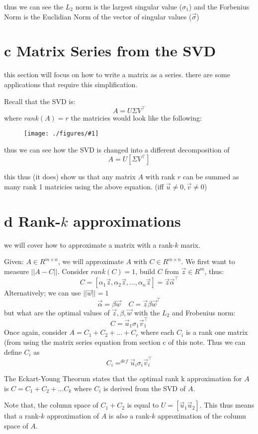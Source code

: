 \documentclass[12pt]{book}
\newcommand{\incimg}[2]{%
       \begin{figure}[h]
               \centering
               \texttt{[image: ./figures/\#1]}
       \end{figure}
}
\begin{document}
thus we can see the $L_2$ norm is the largest singular value ($\sigma_1$) and the Forbenius Norm
is the Euclidian Norm of the vector of singular values ($\vec\sigma$)

\section*{c Matrix Series from the SVD}
this section will focus on how to write a matrix as a series.
there are some applications that require this simplification.

Recall that the SVD is:
\[A = U\Sigma V^\top\]
where $rank(A) = r$
the matricies would look like the following:
\incimg{Explaination}{0.7}

thus we can see how the SVD is changed into a different decomposition of 
\[A = U[\Sigma V^\top]\]

this thus (it does) show us that any matrix $A$ with rank $r$ can be summed as many rank 1
matricies using the above equation. (iff $\vec u \neq 0, \vec v \neq 0$)

\section*{d Rank-$k$ approximations}
we will cover how to approximate a matrix with a rank-$k$ marix.

Given: $A\in R^{m\times n}$, we will approximate $A$ with $C\in R^{m\times n}$.
We first want to measure $||A-C||$.
Consider $rank(C) = 1$, build $C$ from $\vec z \in R^m$, thus:
\[C = [\alpha_1\vec z, \alpha_2\vec z, ..., \alpha_n \vec z] = \vec z \vec \alpha^\top\]
Alternatively; we can use $||\vec w|| = 1$
\[\vec \alpha = \beta\vec w\;\;\;\; C = \vec z\beta\vec w^\top\]
but what are the optimal values of $\vec z, \beta, \vec w$ with the $L_2$ and Frobenius norm:
\[C = \vec u_1 \sigma_1 \vec v_1^\top\]
Once again, consider $A = C_1 + C_2 + ... + C_r$ where each $C_i$ is a rank one matrix (from
using the matrix series equation from section c of this note. Thus we can define $C_i$ as
\[C_i =^{def} \vec u_i \sigma_i \vec v^\top_i\]

The Eckart-Young Theorum states that the optimal rank k approximation for $A$ is $C = C_1 + C_2 
+ ... C_k$ where $C_i$ is derived from the SVD of $A$.

Note that, the column space of $C_1 + C_2$ is equal to $U = [\vec u_1 \vec u_2]$. This thus means
that a rank-$k$ approximation of $A$ is \textit{also} a rank-$k$ approximation of the column
space of $A$.
\end{document}
